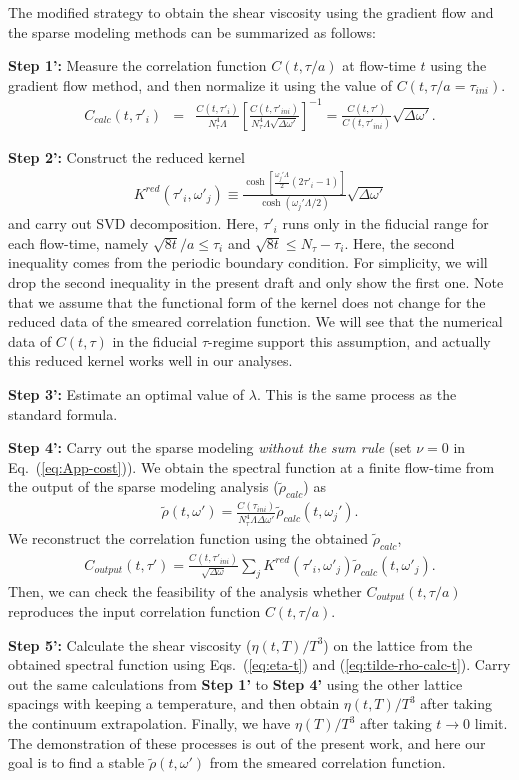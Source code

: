 \documentclass[a4paper,11pt]{article}
\newcommand\beq{ \begin{eqnarray} }
\newcommand\eeq{ \end{eqnarray} }
\begin{document}
The modified strategy to obtain the shear viscosity using the gradient flow and the sparse modeling methods can be summarized as follows:

{\bf Step 1':} Measure the correlation function $C(t,\tau/a)$ at  flow-time $t$ using the gradient flow method, and then normalize it using the value of $C(t,\tau/a=\tau_{ini})$.
\beq
C_{calc} (t,\tau'_i) &=& \frac{C(t,\tau'_i)}{N_\tau^4 \Lambda} \left[  \frac{C(t,\tau'_{ini})}{N_\tau^4 \Lambda  \sqrt{\Delta \omega'}}   \right]^{-1}= \frac{C(t,\tau')}{C(t,\tau'_{ini})} \sqrt{\Delta \omega '}.
\eeq

{\bf Step 2':} Construct the reduced kernel
\beq
K^{red}(\tau'_i,\omega'_j)  \equiv \frac{\cosh [\frac{\omega_j ' \Lambda }{2} (2 \tau'_i -1)]}{\cosh (\omega_j ' \Lambda /2)} \sqrt{\Delta \omega'}\label{eq:kernel-SVD}
\eeq
and carry out SVD decomposition.
Here, $\tau'_i$ runs only in the fiducial range for each flow-time, namely $\sqrt{8t}/a \le \tau_i$ and $\sqrt{8t} \le N_\tau- \tau_i$. Here, the second inequality comes from the periodic boundary condition. 
For simplicity, we will drop the second inequality in the present draft and only show the first one. 
Note that we assume that the functional form of the kernel does not change for the reduced data of the smeared correlation function.
We will see that the numerical data of  $C(t,\tau)$ in the fiducial $\tau$-regime support this assumption, and actually this reduced kernel works well in our analyses.


{\bf Step 3':} Estimate an optimal value of $\lambda$. This is the same process as the standard formula.


{\bf Step 4':} Carry out the sparse modeling {\it without the sum rule} (set $\nu=0$ in Eq.~(\ref{eq:App-cost})).
We obtain the spectral function at a finite flow-time from the output of the sparse modeling analysis ($\tilde{\rho}_{calc}$) as
\beq
\tilde{\rho} (t,\omega')= \frac{C(\tau_{ini})}{N_\tau^4 \Lambda \Delta \omega '} \tilde{\rho}_{calc} (t,\omega_j ').\label{eq:tilde-rho-calc-t}
\eeq
We reconstruct the correlation function using the obtained $\tilde{\rho}_{calc}$,
\beq
C_{output}(t,\tau') = \frac{C(t,\tau'_{ini})}{\sqrt{\Delta \omega}} \sum_j K^{red}(\tau'_i, \omega'_j) \tilde{\rho}_{calc} (t,\omega'_j) .
\eeq
Then, we can check the feasibility of the analysis whether  $C_{output} (t,\tau/a)$ reproduces the input correlation function $C(t,\tau/a)$.


{\bf Step 5':} 
Calculate the shear viscosity ($\eta(t, T)/T^3$) on the lattice from the obtained spectral function using Eqs.~(\ref{eq:eta-t}) and (\ref{eq:tilde-rho-calc-t}).
Carry out the same calculations from {\bf Step 1'} to {\bf Step 4'} using the other lattice spacings with keeping a temperature, and then obtain $\eta(t,T)/T^3$ after taking the continuum extrapolation.
Finally, we have $\eta(T)/T^3$ after taking $t \rightarrow 0$ limit.
The demonstration of these processes is out of the present work, and here our goal is to find a stable $\tilde{\rho}(t,\omega')$ from the smeared correlation function.
\end{document}

